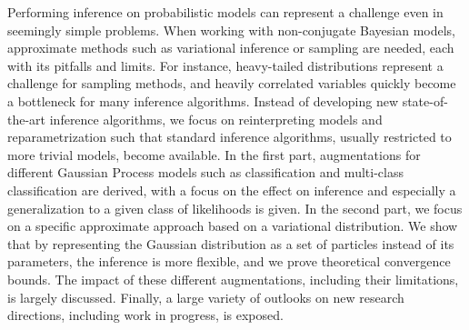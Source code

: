 
\ifCLASSINFOlangDE
{}
\fi

\begin{abstracts}        %
Performing inference on probabilistic models can represent a challenge even in seemingly simple problems.
When working with non-conjugate Bayesian models, approximate methods such as variational inference or sampling are needed, each with its pitfalls and limits.
For instance, heavy-tailed distributions represent a challenge for sampling methods, and heavily correlated variables quickly become a bottleneck for many inference algorithms.
Instead of developing new state-of-the-art inference algorithms, we focus on reinterpreting models and reparametrization such that standard inference algorithms, usually restricted to more trivial models, become available.
In the first part, augmentations for different Gaussian Process models such as classification and multi-class classification are derived, with a focus on the effect on inference and especially a generalization to a given class of likelihoods is given.
In the second part, we focus on a specific approximate approach based on a variational distribution.
We show that by representing the Gaussian distribution as a set of particles instead of its parameters, the inference is more flexible, and we prove theoretical convergence bounds.
The impact of these different augmentations, including their limitations, is largely discussed.
Finally, a large variety of outlooks on new research directions, including work in progress, is exposed.


\end{abstracts}
\ifCLASSINFOlangDE
{}
\fi

